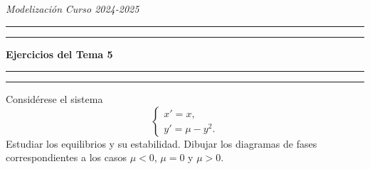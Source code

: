\documentclass[11pt]{report}
\begin{document}
\noindent \textit{Modelización} \hfill \textit{Curso 2024-2025}

\vspace{-6mm}

\begin{center}

	\rule{\textwidth}{1.6pt}\vspace*{-\baselineskip}\vspace*{2pt} %
	\rule{\textwidth}{0.4pt} %
	
    \vspace{3mm}

	{\LARGE \textbf{Ejercicios del Tema 5}} %

    \vspace{2mm}
	
	\rule[0.66\baselineskip]{\textwidth}{0.4pt}\vspace*{-\baselineskip}\vspace{3.2pt} %
	\rule[0.66\baselineskip]{\textwidth}{1.6pt} %

\end{center}

\addtocounter{exercise}{10}

\begin{exercise}
    Considérese el sistema
    \[\begin{cases}
        x' = x, \\
        y' = \mu - y^2.
    \end{cases}\]
    Estudiar los equilibrios y su estabilidad. Dibujar los diagramas de fases correspondientes a los casos $\mu < 0$, $\mu = 0$ y $\mu > 0$.
\end{exercise}
\end{document}
